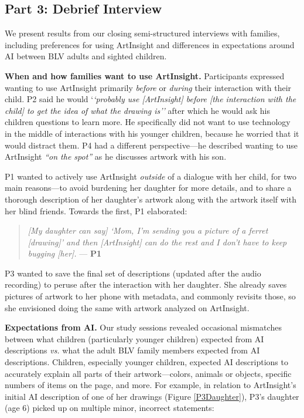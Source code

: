 \documentclass[sigconf]{acmart}
\begin{document}
\subsection{Part 3: Debrief Interview}
We present results from our closing semi-structured interviews with families, including preferences for using ArtInsight and differences in expectations around AI between BLV adults and sighted children.

\textbf{When and how families want to use ArtInsight.} Participants expressed wanting to use ArtInsight primarily \textit{before} or \textit{during} their interaction with their child. P2 said he would `\textit{`probably use [ArtInsight] before [the interaction with the child] to get the idea of what the drawing is''} after which he would ask his children questions to learn more. He specifically did not want to use technology in the middle of interactions with his younger children, because he worried that it would distract them. P4 had a different perspective---he described wanting to use ArtInsight \textit{``on the spot''} as he discusses artwork with his son.

P1 wanted to actively use ArtInsight \textit{outside} of a dialogue with her child, for two main reasons---to avoid burdening her daughter for more details, and to share a thorough description of her daughter's artwork along with the artwork itself with her blind friends. Towards the first, P1 elaborated:

\begin{quote}
    \textit{[My daughter can say] `Mom, I'm sending you a picture of a ferret [drawing]' and then [ArtInsight] can do the rest and I don't have to keep bugging [her].} --- \textbf{P1}
\end{quote}

P3 wanted to save the final set of descriptions (updated after the audio recording) to peruse after the interaction with her daughter. She already saves pictures of artwork to her phone with metadata, and commonly revisits those, so she envisioned doing the same with artwork analyzed on ArtInsight.

\textbf{Expectations from AI.} Our study sessions revealed occasional mismatches between what children (particularly younger children) expected from AI descriptions \textit{vs.} what the adult BLV family members expected from AI descriptions. Children, especially younger children, expected AI descriptions to accurately explain all parts of their artwork---colors, animals or objects, specific numbers of items on the page, and more. For example, in relation to ArtInsight's initial AI description of one of her drawings (Figure \ref{P3Daughter}), P3's daughter (age 6) picked up on multiple minor, incorrect statements:
\end{document}
